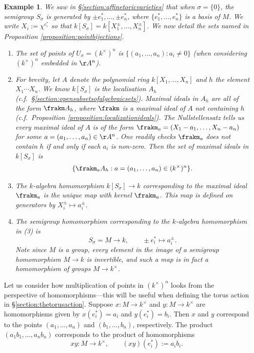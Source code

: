 \documentclass[12pt]{amsart}
\theoremstyle{plain}
\newtheorem{example}[theorem]{Example}
\begin{document}
\begin{example}
We saw in \S \ref{section:affinetoricvarieties} that when $\sigma = \{0\}$, the semigroup $S_\sigma$ is generated by $\pm e_1^*, \ldots, \pm e_n^*$, where $\{e_1^*, \ldots, e_n^*\}$ is a basis of $M$.
We write $X_i := \chi^{e_i^*}$ so that $k[S_\sigma] = k[X_1^{\pm}, \ldots, X_n^\pm]$.
We now detail the sets named in Proposition \ref{proposition:pointbijections}.
\begin{enumerate}
\item The set of points of $U_\sigma = (k^\times)^n$ is $\{(a_1, \ldots, a_n) : a_i \ne 0\}$ (when considering $(k^\times)^n$ embedded in $\AA^n$).
\item For brevity, let $A$ denote the polynomial ring $k[X_1, \ldots, X_n]$ and $h$ the element $X_1 \cdots X_n$.
We know $k[S_\sigma]$ is the localisation $A_h$ (c.f.\ \S\ref{section:opensubsetsofalgebraicsets}).
Maximal ideals in $A_h$ are all of the form $\frakm A_h$, where $\frakm$ is a maximal ideal of $A$ not containing $h$ (c.f.\ Proposition \ref{proposition:localizationideals}).
The Nullstellensatz tells us every maximal ideal of $A$ is of the form $\frakm_a = (X_1 - a_1, \ldots, X_n - a_n)$ for some $a = (a_1, \ldots, a_n) \in \AA^n$.
One readily checks $\frakm_a$ does not contain $h$ if and only if each $a_i$ is non-zero.
Then the set of maximal ideals in $k[S_\sigma]$ is $$\{\frakm_a A_h : a = (a_1, \ldots, a_n) \in (k^\times)^n\}.$$
\item The $k$-algebra homomorphism $k[S_\sigma] \to k$ corresponding to the maximal ideal $\frakm_a$ is the unique map with kernel $\frakm_a$.
This map is defined on generators by $X_i^\pm \mapsto a_i^\pm$.
\item The semigroup homomorphism corresponding to the $k$-algebra homomorphism in (3) is
$$S_\sigma = M \to k, \qquad \pm e_i^* \mapsto a_i^\pm.$$
Note since $M$ is a group, every element in the image of a semigroup homomorphism $M \to k$ is invertible, and such a map is in fact a homomorphism of groups $M \to k^\times$.
\end{enumerate}
\end{example}

Let us consider how multiplication of points in $(k^\times)^n$ looks from the perspective of homomorphisms---this will be useful when defining the torus action in \S \ref{section:thetorusaction}.
Suppose $x : M \to k^\times$ and $y : M \to k^\times$ are homomorphisms given by $x(e_i^*) = a_i$ and $y(e_i^*) = b_i$.
Then $x$ and $y$ correspond to the points $(a_1, \ldots, a_n)$ and $(b_1, \ldots, b_n)$, respectively.
The product $(a_1 b_1, \ldots, a_n b_n)$ corresponds to the product of homomorphisms
$$xy : M \to k^\times, \qquad (xy)(e_i^*) := a_i b_i.$$
\end{document}
